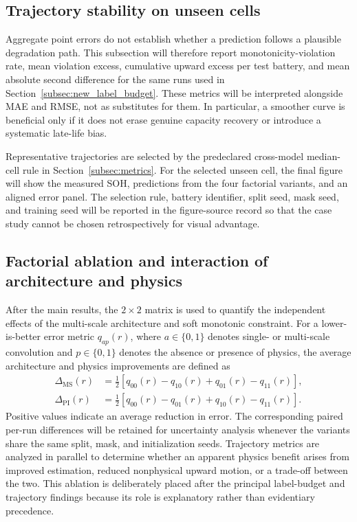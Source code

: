 \documentclass[a4paper,fleqn]{cas-dc}
\begin{document}
\subsection{Trajectory stability on unseen cells}
\label{subsec:new_trajectory_results}

Aggregate point errors do not establish whether a prediction follows a plausible degradation path. This subsection will therefore report monotonicity-violation rate, mean violation excess, cumulative upward excess per test battery, and mean absolute second difference for the same runs used in Section~\ref{subsec:new_label_budget}. These metrics will be interpreted alongside MAE and RMSE, not as substitutes for them. In particular, a smoother curve is beneficial only if it does not erase genuine capacity recovery or introduce a systematic late-life bias.

Representative trajectories are selected by the predeclared cross-model median-cell rule in Section~\ref{subsec:metrics}. For the selected unseen cell, the final figure will show the measured SOH, predictions from the four factorial variants, and an aligned error panel. The selection rule, battery identifier, split seed, mask seed, and training seed will be reported in the figure-source record so that the case study cannot be chosen retrospectively for visual advantage.

\subsection{Factorial ablation and interaction of architecture and physics}
\label{subsec:new_factorial_ablation}

After the main results, the $2\times2$ matrix is used to quantify the independent effects of the multi-scale architecture and soft monotonic constraint. For a lower-is-better error metric $q_{ap}(r)$, where $a\in\{0,1\}$ denotes single- or multi-scale convolution and $p\in\{0,1\}$ denotes the absence or presence of physics, the average architecture and physics improvements are defined as
\begin{align}
\Delta_{\mathrm{MS}}(r) &= \tfrac{1}{2}\left[q_{00}(r)-q_{10}(r)+q_{01}(r)-q_{11}(r)\right],\\
\Delta_{\mathrm{PI}}(r) &= \tfrac{1}{2}\left[q_{00}(r)-q_{01}(r)+q_{10}(r)-q_{11}(r)\right].
\end{align}
Positive values indicate an average reduction in error. The corresponding paired per-run differences will be retained for uncertainty analysis whenever the variants share the same split, mask, and initialization seeds. Trajectory metrics are analyzed in parallel to determine whether an apparent physics benefit arises from improved estimation, reduced nonphysical upward motion, or a trade-off between the two. This ablation is deliberately placed after the principal label-budget and trajectory findings because its role is explanatory rather than evidentiary precedence.
\end{document}
